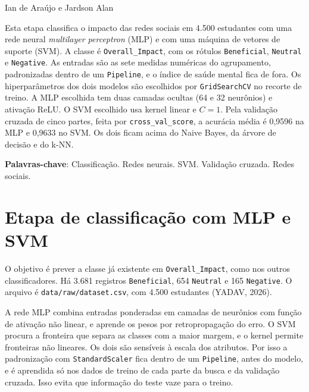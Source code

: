 \documentclass[
  article,
  12pt,
  oneside,
  a4paper,
  english,
  brazil,
  chapter=TITLE,
  section=TITLE,
  subsection=TITLE
]{abntex2}
\renewcommand{\imprimircapa}{%
  \begin{capa}%
    \SingleSpacing
    \begin{center}
      \imprimirinstituicao\par
      \vspace*{\fill}
      \imprimirautor\par
      \vspace*{\fill}
      {\bfseries\imprimirtitulo\par}
      \vspace*{\fill}
      \imprimirlocal\par
      \imprimirdata\par
    \end{center}
    \vspace*{1cm}
  \end{capa}%
}
\begin{document}
\pretextual
\imprimircapa
\imprimirfolhaderosto

\textual

\begin{center}
  \bfseries\imprimirtitulo
\end{center}

\vspace{0.75\baselineskip}
\noindent Ian de Araújo\footnotemark{} e Jardson Alan\footnotemark[\value{footnote}]

\begin{resumo}
Esta etapa classifica o impacto das redes sociais em 4.500 estudantes com uma rede neural \emph{multilayer perceptron} (MLP) e com uma máquina de vetores de suporte (SVM). A classe é \texttt{Overall\_Impact}, com os rótulos \texttt{Beneficial}, \texttt{Neutral} e \texttt{Negative}. As entradas são as sete medidas numéricas do agrupamento, padronizadas dentro de um \texttt{Pipeline}, e o índice de saúde mental fica de fora. Os hiperparâmetros dos dois modelos são escolhidos por \texttt{GridSearchCV} no recorte de treino. A MLP escolhida tem duas camadas ocultas (64 e 32 neurônios) e ativação ReLU. O SVM escolhido usa kernel linear e $C = 1$. Pela validação cruzada de cinco partes, feita por \texttt{cross\_val\_score}, a acurácia média é 0,9596 na MLP e 0,9633 no SVM. Os dois ficam acima do Naive Bayes, da árvore de decisão e do k-NN.

\vspace{\onelineskip}
\noindent
\textbf{Palavras-chave}: Classificação. Redes neurais. SVM. Validação cruzada. Redes sociais.
\end{resumo}

\section{Etapa de classificação com MLP e SVM}

O objetivo é prever a classe já existente em \texttt{Overall\_Impact}, como nos outros classificadores. Há 3.681 registros \texttt{Beneficial}, 654 \texttt{Neutral} e 165 \texttt{Negative}. O arquivo é \texttt{data/raw/}\allowbreak\texttt{dataset.csv}, com 4.500 estudantes (YADAV, 2026).

A rede MLP combina entradas ponderadas em camadas de neurônios com função de ativação não linear, e aprende os pesos por retropropagação do erro. O SVM procura a fronteira que separa as classes com a maior margem, e o kernel permite fronteiras não lineares. Os dois são sensíveis à escala dos atributos. Por isso a padronização com \texttt{StandardScaler} fica dentro de um \texttt{Pipeline}, antes do modelo, e é aprendida só nos dados de treino de cada parte da busca e da validação cruzada. Isso evita que informação do teste vaze para o treino.
\end{document}
